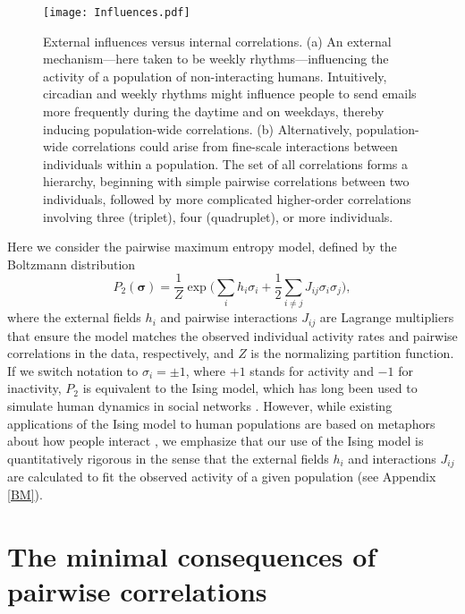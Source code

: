 \documentclass[aps,reprint,superscriptaddress,amsmath,amssymb,longbibliography]{revtex4-1}
\begin{document}
\begin{figure}
\texttt{[image: Influences.pdf]}
\caption{\label{Influence} External influences versus internal correlations. (a) An external mechanism---here taken to be weekly rhythms---influencing the activity of a population of non-interacting humans. Intuitively, circadian and weekly rhythms might influence people to send emails more frequently during the daytime and on weekdays, thereby inducing population-wide correlations. (b) Alternatively, population-wide correlations could arise from fine-scale interactions between individuals within a population. The set of all correlations forms a hierarchy, beginning with simple pairwise correlations between two individuals, followed by more complicated higher-order correlations involving three (triplet), four (quadruplet), or more individuals.}
\end{figure}

Here we consider the pairwise maximum entropy model, defined by the Boltzmann distribution
\begin{equation}
\label{P2}
P_2(\bm{\sigma}) = \frac{1}{Z}\exp\Bigg(\sum_i h_i\sigma_i + \frac{1}{2}\sum_{i\neq j} J_{ij}\sigma_i\sigma_j\Bigg) ,
\end{equation}
where the external fields $h_i$ and pairwise interactions $J_{ij}$ are Lagrange multipliers that ensure the model matches the observed individual activity rates and pairwise correlations in the data, respectively, and $Z$ is the normalizing partition function. If we switch notation to $\sigma_i = \pm 1$, where $+1$ stands for activity and $-1$ for inactivity, $P_2$ is equivalent to the Ising model, which has long been used to simulate human dynamics in social networks \cite{Castellano-01,Galam-02,Galam-05,Galam-01,Lynn-01}. However, while existing applications of the Ising model to human populations are based on metaphors about how people interact \cite{Galam-02,Galam-04,Galam-05,Lynn-01,Lynn-02}, we emphasize that our use of the Ising model is quantitatively rigorous in the sense that the external fields $h_i$ and interactions $J_{ij}$ are calculated to fit the observed activity of a given population (see Appendix \ref{BM}).

\section{The minimal consequences of pairwise correlations}
\end{document}
